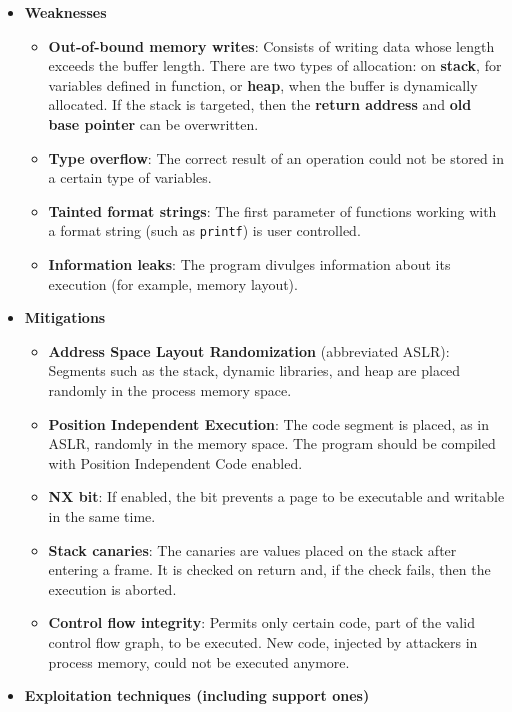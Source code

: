 \documentclass[12pt,a4paper,english,onecolumn]{IEEEtran}
\begin{document}
\begin{itemize}
    \item \textbf{Weaknesses} \begin{itemize}
        \item \textbf{Out-of-bound memory writes}: Consists of writing data whose length exceeds the buffer length. There are two types of allocation: on \textbf{stack}, for variables defined in function, or \textbf{heap}, when the buffer is dynamically allocated. If the stack is targeted, then the \textbf{return address} and \textbf{old base pointer} can be overwritten.
        \item \textbf{Type overflow}: The correct result of an operation could not be stored in a certain type of variables.
        \item \textbf{Tainted format strings}: The first parameter of functions working with a format string (such as \texttt{printf}) is user controlled.
        \item \textbf{Information leaks}: The program divulges information about its execution (for example, memory layout).
    \end{itemize}
    \item \textbf{Mitigations} \begin{itemize}
        \item \textbf{Address Space Layout Randomization} (abbreviated ASLR): Segments such as the stack, dynamic libraries, and heap are placed randomly in the process memory space.
        \item \textbf{Position Independent Execution}: The code segment is placed, as in ASLR, randomly in the memory space. The program should be compiled with Position Independent Code enabled.
        \item \textbf{NX bit}: If enabled, the bit prevents a page to be executable and writable in the same time.
        \item \textbf{Stack canaries}: The canaries are values placed on the stack after entering a frame. It is checked on return and, if the check fails, then the execution is aborted.
        \item \textbf{Control flow integrity}: Permits only certain code, part of the valid control flow graph, to be executed. New code, injected by attackers in process memory, could not be executed anymore.
    \end{itemize}
    \item \textbf{Exploitation techniques (including support ones)} \begin{itemize}

\end{itemize}
\end{itemize}
\end{document}
